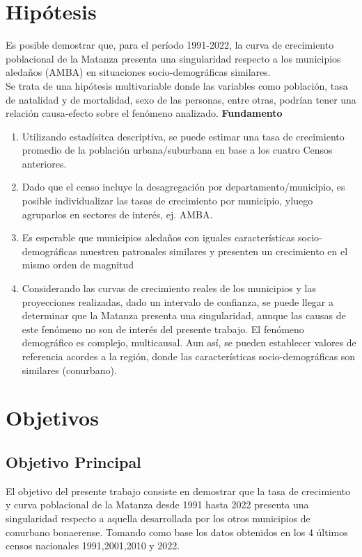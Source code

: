 \documentclass{article}
\theoremstyle{mytheoremstyle}
\theoremstyle{mytheoremstyle}
\theoremstyle{myproblemstyle}
\begin{document}
\section{Hipótesis}
Es posible demostrar que, para el período 1991-2022, la curva de crecimiento poblacional de la Matanza presenta una singularidad respecto a los municipios aledaños (AMBA) en situaciones socio-demográficas 
similares. \\
Se trata de una hipótesis multivariable donde las variables como población, tasa de natalidad y de mortalidad, sexo de las personas, entre otras, podrían tener una relación causa-efecto sobre el fenómeno analizado.\newline
\smallskip
\textbf{Fundamento}
\begin{enumerate}
  \item Utilizando estadísitca descriptiva, se puede estimar una tasa de crecimiento promedio de la población urbana/suburbana en base a los cuatro Censos anteriores.
  \item Dado que el censo incluye la desagregación por departamento/municipio, es posible individualizar las tasas de crecimiento por municipio, yluego agruparlos en sectores de interés, ej. AMBA.
 \item Es esperable que municipios aledaños con iguales características socio-demográficas muestren patronales similares y presenten un crecimiento en el mismo orden de magnitud
  \item Considerando las curvas de crecimiento reales de los municipios y las proyecciones realizadas, dado un intervalo de confianza, se puede llegar a determinar que la Matanza presenta una singularidad, 
aunque las causas de este fenómeno no son de interés del presente trabajo. El fenómeno demográfico es complejo, multicausal. Aun así, se pueden establecer valores de referencia acordes a la región, donde las características socio-demográficas son similares (conurbano).
\end{enumerate}

 
\section{Objetivos }
 \subsection{Objetivo Principal}
El objetivo del presente trabajo consiste en demostrar que la tasa de crecimiento y 
curva poblacional de la Matanza desde 1991 hasta 2022 presenta una singularidad respecto 
a aquella desarrollada por los otros municipios de conurbano bonaerense. 
Tomando como base los datos obtenidos en los 4 últimos censos nacionales 1991,2001,2010 y 2022.  
\end{document}
